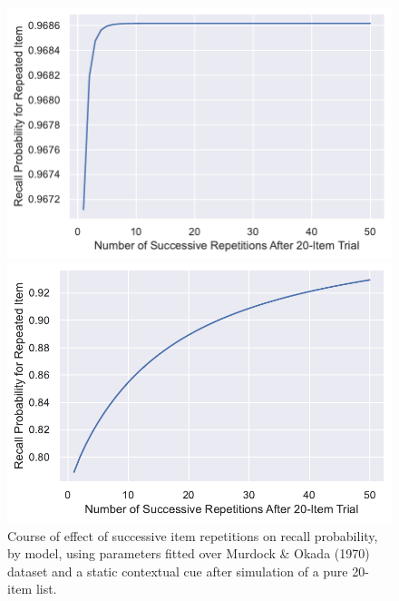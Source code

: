 \documentclass[
  letterpaper,
]{article}
\begin{document}
\begin{figure}

\begin{minipage}[c]{0.50\linewidth}

{\centering 

\includegraphics{./figures/cmr_repeffect.pdf}

}

\end{minipage}%
%
\begin{minipage}[c]{0.50\linewidth}

{\centering 

\includegraphics{./figures/icmr_repeffect.pdf}

}

\end{minipage}%

\caption{\label{fig-repeffect}Course of effect of successive item
repetitions on recall probability, by model, using parameters fitted
over Murdock \& Okada (1970) dataset and a static contextual cue after
simulation of a pure 20-item list.}

\end{figure}
\end{document}
